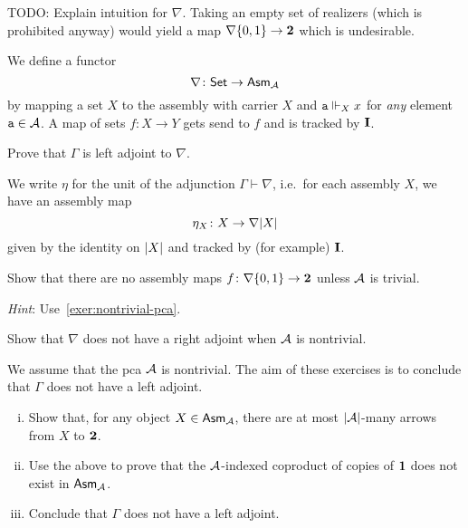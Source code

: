 \textcolor{Mulberry}{TODO: Explain intuition for \(\nabla\). Taking an empty set
  of realizers (which is prohibited anyway) would yield a map
  \(\nabla\set{0,1} \to \Two\) which is undesirable.}
\begin{definition}[\(\nabla\)]
  We define a functor
  \[
    \nabla \colon \Set \to \Asm{\AA}
  \]
  by mapping a set \(X\) to the assembly with carrier \(X\) and
  \(\pca{a} \realizes_X x\) for \emph{any} element \(\pca{a} \in \AA\).
  A map of sets \(f \colon X \to Y\) gets send to \(f\) and is tracked by
  \(\icomb\).
\end{definition}

\begin{exercise}\label{exer:Gamma-left-adjoint-to-nabla}
  Prove that \(\Gamma\) is left adjoint to \(\nabla\).
\end{exercise}

\begin{notation}[\(\eta\)]
  We write \(\eta\) for the unit of the adjunction \(\Gamma \vdash \nabla\),
  i.e.\ for each assembly \(X\), we have an assembly map
  \[
    \eta_X \colon X \to \nabla \carrier{X}
  \]
  given by the identity on \(\carrier{X}\) and tracked by (for example)
  \(\icomb\).
\end{notation}

\begin{exercise}\label{exer:no-nabla-to-Two}
  Show that there are no assembly maps \(f \colon \nabla\set{0,1} \to \Two\) unless
  \(\AA\) is trivial.

  \emph{Hint}: Use~\cref{exer:nontrivial-pca}.
\end{exercise}

\begin{exercise}\label{exer:nabla-no-right-adjoint}
  Show that \(\nabla\) does not have a right adjoint when \(\AA\) is nontrivial.

\end{exercise}

\begin{exercise}\label{exer:Gamma-no-left-adjoint}
  We assume that the pca \(\AA\) is nontrivial. The aim of these exercises is to
  conclude that \(\Gamma\) does not have a left adjoint.
  \begin{enumerate}[(i)]
  \item Show that, for any object \(X \in \Asm{\AA}\), there are at most
    \(\carrier{\AA}\)-many arrows from \(X\) to \(\Two\).
  \item Use the above to prove that the \(\AA\)-indexed coproduct of copies of
    \(\One\) does not exist in \(\Asm{\AA}\).
  \item Conclude that \(\Gamma\) does not have a left adjoint.
  \end{enumerate}
\end{exercise}

